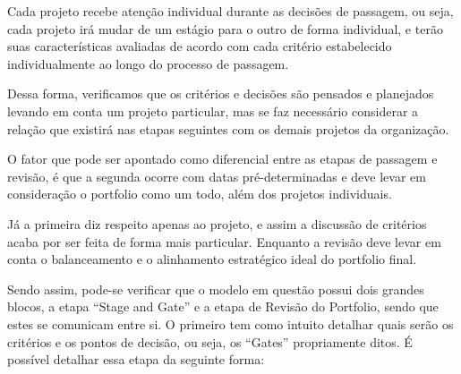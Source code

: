 \documentclass[12pt,a4paper,ruledheader,tocpage=prefix,floatnumber=continuous,pagestart=folhaderosto,font=times]{abnt}
\begin{document}
Cada projeto recebe atenção individual durante as decisões de passagem, ou seja, cada projeto irá mudar de um estágio para o outro de forma individual,
e terão suas características avaliadas de acordo com cada critério estabelecido individualmente ao longo do processo de passagem. 

Dessa forma, verificamos que os critérios e decisões são pensados e planejados levando em conta um projeto particular, mas se faz necessário considerar
a relação que existirá nas etapas seguintes com os demais projetos da organização.

O fator que pode ser apontado como diferencial entre as etapas de passagem e revisão, é que a segunda ocorre com datas pré-determinadas e deve levar em 
consideração o portfolio como um todo, além dos projetos individuais. 

Já a primeira diz respeito apenas ao projeto, e assim a discussão de critérios acaba por ser feita de forma mais particular. Enquanto a revisão deve 
levar em conta o balanceamento e o alinhamento estratégico ideal do portfolio final.

Sendo assim, pode-se verificar que o modelo em questão possui dois grandes blocos, a etapa ``Stage and Gate'' e a etapa de Revisão do Portfolio, sendo que
estes se comunicam entre si. O primeiro tem como intuito detalhar quais serão os critérios e os pontos de decisão, ou seja, os ``Gates'' propriamente ditos.
É possível detalhar essa etapa da seguinte forma:
\end{document}

